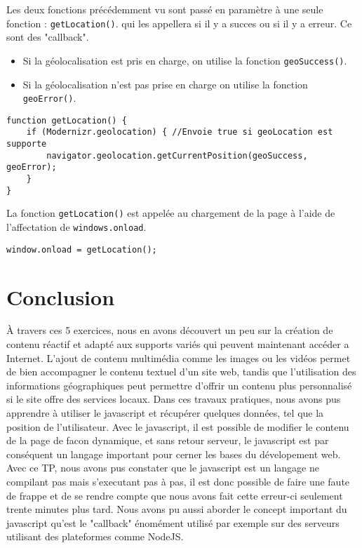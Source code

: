 Les deux fonctions précédemment vu sont passé en paramètre à une seule fonction : \texttt{getLocation()}. qui les appellera si il y a succes ou si il y a erreur. Ce sont des "callback".
\begin{itemize}
  \item Si la géolocalisation est pris en charge, on utilise la fonction \texttt{geoSuccess()}.
  \item Si la géolocalisation n'est pas prise en charge on utilise la fonction \texttt{geoError()}.
\end{itemize}

\begin{verbatim}
function getLocation() {
	if (Modernizr.geolocation) { //Envoie true si geoLocation est supporte
		navigator.geolocation.getCurrentPosition(geoSuccess, geoError);
	}
}
\end{verbatim}

La fonction \texttt{getLocation()} est appelée au chargement de la page à l'aide de l'affectation de \texttt{windows.onload}.
\begin{verbatim}
window.onload = getLocation();
\end{verbatim}


\section{Conclusion}
À travers ces 5 exercices, nous en avons découvert un peu sur la création de contenu réactif et adapté aux supports variés qui peuvent maintenant accéder a Internet. L'ajout de contenu multimédia comme les images ou les vidéos permet de bien accompagner le contenu textuel d'un site web, tandis que l'utilisation des informations géographiques peut permettre d'offrir un contenu plus personnalisé si le site offre des services locaux.
Dans ces travaux pratiques, nous avons pus apprendre à utiliser le javascript et récupérer quelques données, tel que la position de l'utilisateur. Avec le javascript, il est possible de modifier le contenu de la page de facon dynamique, et sans retour serveur, le javascript est par conséquent un langage important pour cerner les bases du dévelopement web. Avec ce TP, nous avons pus constater que le javascript est un langage ne compilant pas mais s'executant pas à pas, il est donc possible de faire une faute de frappe et de se rendre compte que nous avons fait cette erreur-ci seulement trente minutes plus tard.
Nous avons pu aussi aborder le concept important du javascript qu'est le "callback" énomément utilisé par exemple sur des serveurs utilisant des plateformes comme NodeJS.
